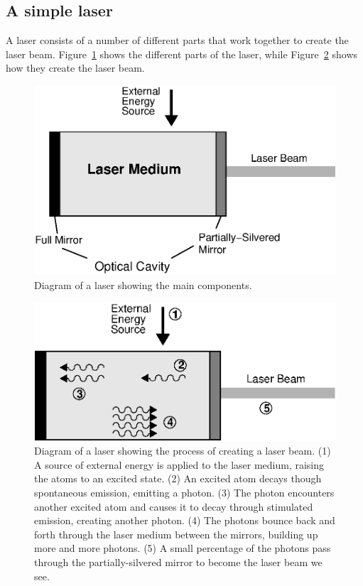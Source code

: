 \subsection{A simple laser}


A laser consists of a number of different parts that work together to create the laser beam.  Figure~\ref{lasercavity} shows the different parts of the laser, while Figure~\ref{laserprocess} shows how they create the laser beam.\\

\begin{figure}[!htb]
\begin{center}
\includegraphics[width=4.8in]{../../epsimages/laser-cavity_2.eps}
\end{center}
\caption{Diagram of a laser showing the main components.}
\label{lasercavity}
\end{figure}


\begin{figure}[!tb]
\begin{center}
\includegraphics[width=4.5in]{../../epsimages/laser-process.eps}
\end{center}
\caption{Diagram of a laser showing the process of creating a laser beam. (1) A source of external energy is applied to the laser medium, raising the atoms to an excited state. (2) An excited atom decays though spontaneous emission, emitting a photon.  (3) The photon encounters another excited atom and causes it to decay through stimulated emission, creating another photon. (4) The photons bounce back and forth through the laser medium between the mirrors, building up more and more photons.  (5) A small percentage of the photons pass through the partially-silvered mirror to become the laser beam we see.}
\label{laserprocess}
\end{figure}
 
